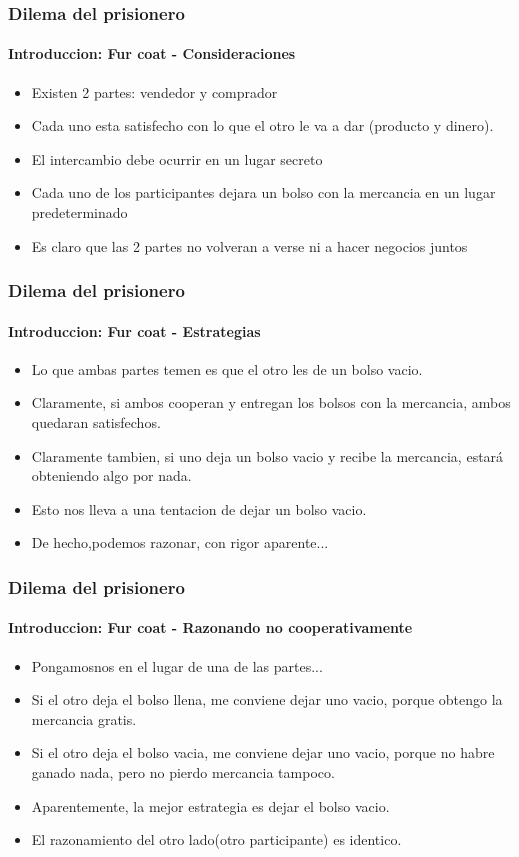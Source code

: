 \documentclass{beamer}
\begin{document}
\begin{frame}
  \frametitle{Dilema del prisionero}
  \framesubtitle{Introduccion: Fur coat - Consideraciones}
  \begin{itemize}
    \setlength{\itemsep}{4pt}
    \item Existen 2 partes: vendedor y comprador
    \pause
    \item Cada uno esta satisfecho con lo que el otro le va a dar (producto y dinero).
    \pause 
    \item El intercambio debe ocurrir en un lugar secreto
    \pause
    \item Cada uno de los participantes dejara un bolso con la mercancia en un lugar predeterminado
    \pause
    \item Es claro que las 2 partes no volveran a verse ni a hacer negocios juntos
  \end{itemize}
\end{frame}

\begin{frame}
  \frametitle{Dilema del prisionero}
  \framesubtitle{Introduccion: Fur coat - Estrategias}
  \begin{itemize}
    \setlength{\itemsep}{4pt}
    \item Lo que ambas partes temen es que el otro les de un bolso vacio.
    \pause
    \item Claramente, si ambos cooperan y entregan los bolsos con la mercancia, ambos quedaran satisfechos.
    \pause
    \item Claramente tambien, si uno deja un bolso vacio y recibe la mercancia, estar\'a obteniendo algo por nada.
    \pause
    \item Esto nos lleva a una tentacion de dejar un bolso vacio.
    \pause
    \item De hecho,podemos razonar, con rigor aparente...
  \end{itemize}
\end{frame}

\begin{frame}
  \frametitle{Dilema del prisionero}
  \framesubtitle{Introduccion: Fur coat - Razonando no cooperativamente}
  \begin{itemize}
    \setlength{\itemsep}{4pt}
    \item Pongamosnos en el lugar de una de las partes...
    \pause
    \item Si el otro deja el bolso llena, me conviene dejar uno vacio, porque obtengo la mercancia gratis.
    \pause 
    \item Si el otro deja el bolso vacia, me conviene dejar uno vacio, porque no habre ganado nada, pero no pierdo mercancia tampoco.
    \pause
    \item Aparentemente, la mejor estrategia es dejar el bolso vacio.
    \pause
    \item El razonamiento del otro lado(otro participante) es identico.
  \end{itemize}
\end{frame}
\end{document}
